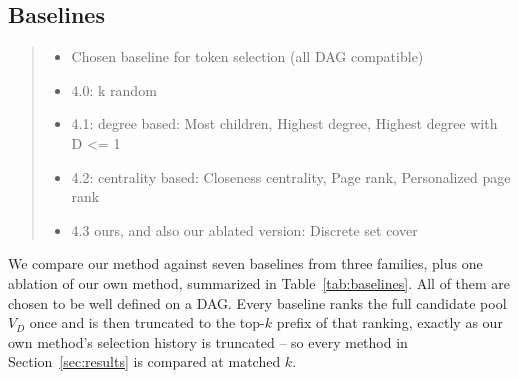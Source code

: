 \subsection{Baselines}
\label{sec:method:baselines}

\begin{quote}\small\itshape
\begin{itemize}
\item Chosen baseline for token selection (all DAG compatible)
\item 4.0: k random
\item 4.1: degree based: Most children, Highest degree, Highest degree with D <= 1
\item 4.2: centrality based: Closeness centrality, Page rank, Personalized page rank
\item 4.3 ours, and also our ablated version: Discrete set cover
\end{itemize}
\end{quote}

We compare our method against seven baselines from three families, plus one
ablation of our own method, summarized in Table~\ref{tab:baselines}. All of
them are chosen to be well defined on a DAG. Every baseline ranks the full
candidate pool $V_D$ once and is then truncated to the top-$k$ prefix of
that ranking, exactly as our own method's selection history is truncated --
so every method in Section~\ref{sec:results} is compared at matched $k$.

